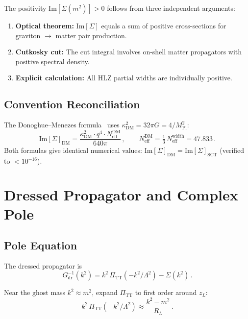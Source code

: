 \documentclass[11pt,a4paper]{article}
\newcommand{\PiTT}{\Pi_{\mathrm{TT}}}
\newcommand{\MPl}{M_{\mathrm{Pl}}}
\newcommand{\Neff}{N_{\mathrm{eff}}}
\newcommand{\Imag}{\mathrm{Im}}
\begin{document}
The positivity $\Imag[\Sigma(m^2)] > 0$ follows from three
independent arguments:
\begin{enumerate}[nosep]
  \item \textbf{Optical theorem:} $\Imag[\Sigma]$ equals a sum of
    positive cross-sections for graviton $\to$ matter pair production.
  \item \textbf{Cutkosky cut:} The cut integral involves on-shell
    matter propagators with positive spectral density.
  \item \textbf{Explicit calculation:} All HLZ partial widths are
    individually positive.
\end{enumerate}

\subsection{Convention Reconciliation}

The Donoghue--Menezes formula~\cite{Donoghue2019} uses
$\kappa_{\mathrm{DM}}^2 = 32\pi G = 4/\MPl^2$:
\begin{equation}
  \Imag[\Sigma]_{\mathrm{DM}}
  = \frac{\kappa_{\mathrm{DM}}^2 \cdot q^4 \cdot
    \Neff^{\mathrm{DM}}}{640\pi}\,,
  \qquad
  \Neff^{\mathrm{DM}} = \tfrac{1}{3}\,\Neff^{\mathrm{width}}
  = 47.833\,.
\end{equation}
Both formulas give identical numerical values:
$\Imag[\Sigma]_{\mathrm{DM}} = \Imag[\Sigma]_{\mathrm{SCT}}$
(verified to $< 10^{-16}$).


\section{Dressed Propagator and Complex Pole}
\label{sec:dressed}

\subsection{Pole Equation}

The dressed propagator is
\begin{equation}\label{eq:G-dressed}
  G_{\mathrm{dr}}^{-1}(k^2)
  = k^2\,\PiTT(-k^2/\Lambda^2) - \Sigma(k^2)\,.
\end{equation}

Near the ghost mass $k^2 \approx m^2$, expand $\PiTT$ to first order
around $z_L$:
\begin{equation}
  k^2\,\PiTT(-k^2/\Lambda^2)
  \approx \frac{k^2 - m^2}{R_L}\,.
\end{equation}
\end{document}
